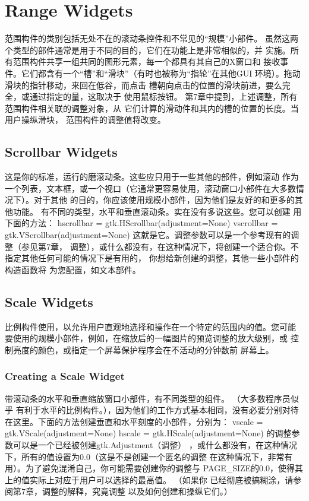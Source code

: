\chapter{Range Widgets}
范围构件的类别包括无处不在的滚动条控件和不常见的“规模”小部件。
虽然这两个类型的部件通常是用于不同的目的，它们在功能上是非常相似的，并
实施。所有范围构件共享一组共同的图形元素，每一个都具有其自己的X窗口和
接收事件。它们都含有一个“槽”和“滑块”（有时也被称为“指轮”在其他GUI
环境）。拖动滑块的指针移动，来回在低谷，而点击
槽朝向点击的位置的滑块前进，要么完全，或通过指定的量，这取决于
使用鼠标按钮。
第7章中提到，上述调整，所有范围构件相关联的调整对象，从
它们计算的滑动件和其内的槽的位置的长度。当用户操纵滑块，
范围构件的调整值将改变。
\section{Scrollbar Widgets}
这是你的标准，运行的磨滚动条。这些应只用于一些其他的部件，例如滚动
作为一个列表，文本框，或一个视口（它通常更容易使用，滚动窗口小部件在大多数情况下）。对于其他
的目的，你应该使用规模小部件，因为他们是友好的和更多的其他功能。
有不同的类型，水平和垂直滚动条。实在没有多说这些。您可以创建
用下面的方法：
hscrollbar = gtk.HScrollbar(adjustment=None)
vscrollbar = gtk.VScrollbar(adjustment=None)
这就是它。调整参数可以是一个参考现有的调整（参见第7章，
调整），或什么都没有，在这种情况下，将创建一个适合你。不指定其他任何可能的情况下是有用的，
你想给新创建的调整，其他一些小部件的构造函数将
为您配置，如文本部件。
\section{Scale Widgets}
比例构件使用，以允许用户直观地选择和操作在一个特定的范围内的值。您可能
要使用的规模小部件，例如，在缩放后的一幅图片的预览调整的放大级别，或
控制亮度的颜色，或指定一个屏幕保护程序会在不活动的分钟数前
屏幕上。	
\subsection{Creating a Scale Widget}
带滚动条的水平和垂直缩放窗口小部件，有不同类型的组件。 （大多数程序员似乎
有利于水平的比例构件。），因为他们的工作方式基本相同，没有必要分别对待
在这里。下面的方法创建垂直和水平刻度的小部件，分别为：
vscale = gtk.VScale(adjustment=None)
hscale = gtk.HScale(adjustment=None)
的调整参数可以是一个已经被创建gtk.Adjustment（调整）
，或什么都没有，在这种情况下，所有的值设置为0.0（这是不是创建一个匿名的调整
在这种情况下，非常有用）。为了避免混淆自己，你可能需要创建你的调整与
PAGE_SIZE的0.0，使得其上的值实际上对应于用户可以选择的最高值。 （如果你
已经彻底被搞糊涂，请参阅第7章，调整的解释，究竟调整
以及如何创建和操纵它们。）
